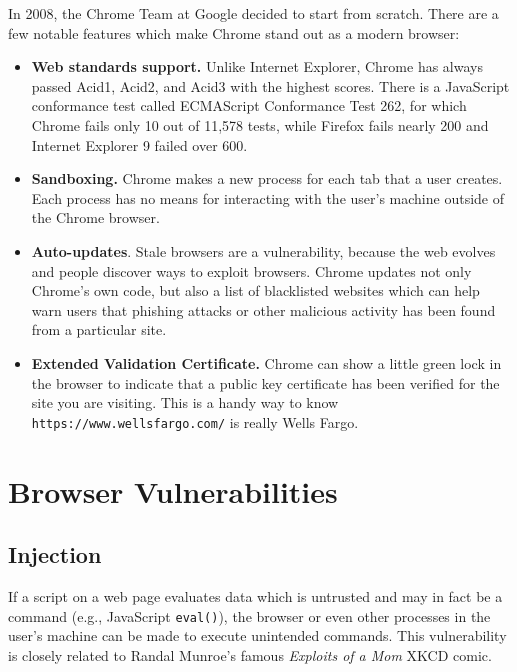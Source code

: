 \documentclass[a4paper, 11pt]{article} %
\begin{document}
In 2008, the Chrome Team at Google decided to start from scratch. \cite{chrome-comic} There are a few notable features which make Chrome stand out as a modern browser:

\begin{itemize}
	\item \textbf{Web standards support.} Unlike Internet Explorer, Chrome has always passed Acid1, Acid2, and Acid3 with the highest scores. There is a JavaScript conformance test called ECMAScript Conformance Test 262, for which Chrome fails only 10 out of 11,578 tests, while Firefox fails nearly 200 and Internet Explorer 9 failed over 600. \cite{Googl45:online}
	\item \textbf{Sandboxing.} Chrome makes a new process for each tab that a user creates. Each process has no means for interacting with the user's machine outside of the Chrome browser. \cite{Googl36:online}
	\item \textbf{Auto-updates}. Stale browsers are a vulnerability, because the web evolves and people discover ways to exploit browsers. Chrome updates not only Chrome's own code, but also a list of blacklisted websites which can help warn users that phishing attacks or other malicious activity has been found from a particular site.
	\item \textbf{Extended Validation Certificate.} Chrome can show a little green lock in the browser to indicate that a public key certificate has been verified for the site you are visiting. This is a handy way to know \texttt{https://www.wellsfargo.com/} is really Wells Fargo.
\end{itemize}

\eject

\section{Browser Vulnerabilities}

\subsection{Injection}

If a script on a web page evaluates data which is untrusted and may in fact be a command (e.g., JavaScript \texttt{eval()}), the browser or even other processes in the user's machine can be made to execute unintended commands. This vulnerability is closely related to Randal Munroe's famous \textit{Exploits of a Mom} XKCD comic. \cite{xkcd:10:online}
\end{document}
